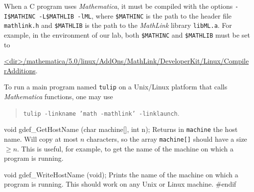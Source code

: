    When a C program uses {\em Mathematica}, it must be compiled with the
    options
   \texttt{-I\$MATHINC -L\$MATHLIB -lML}, where 
   \texttt{\$MATHINC} is the path to the header file \texttt{mathlink.h} and 
   \texttt{\$MATHLIB} is the path to the {\em MathLink\/} library \texttt{libML.a}.
   For example, in the environment of our lab, both 
   \texttt{\$MATHINC} and \texttt{\$MATHLIB} must be set to

   \url{<dir>/mathematica/5.0/linux/AddOns/MathLink/DeveloperKit/Linux/CompilerAdditions}.

  To run a main program named \texttt{tulip} on a Unix/Linux platform
  that calls {\em  Mathematica} functions, one may use
 \begin{verse} 
  \texttt{tulip -linkname 'math -mathlink' -linklaunch}.
 \end{verse}
  \endtab


\code

void gdef_GetHostName (char machine[], int n);
\endcode
  \tab Returns in \texttt{machine} the host name. 
  Will copy at most $n$ characters, so the array \texttt{machine[]}
  should have a size $\ge n$. This is useful, for example,
  to get the name of the machine on which a program is running.
  \endtab
\code


void gdef_WriteHostName (void);
\endcode
  \tab Prints the name of the machine on which a program is running.
   This should work on any Unix or Linux machine.
  \endtab
\hide
\code
#endif
\endcode
\endhide
